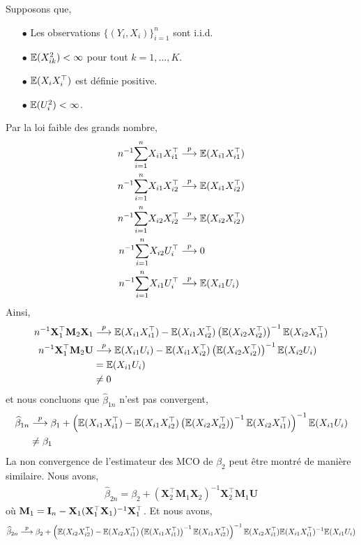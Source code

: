 \documentclass[12pt, reqno]{amsart}
\begin{document}
Supposons que,
\begin{itemize}
\item[$\bullet$] Les observations $\{(Y_i, X_i)\}_{i=1}^n$ sont i.i.d.
\item[$\bullet$] $\mathbb{E}(X_{ik}^2) < \infty$ pour tout $k=1,...,K$.
\item[$\bullet$] $\mathbb{E}(X_iX_i^\top)$ est définie positive.
\item[$\bullet$] $\mathbb{E}(U_i^2) < \infty$.
\end{itemize}
Par la loi faible des grands nombre,
\begin{align*}
n^{-1}\underset{i=1}{\overset{n}{\sum}} X_{i1}X_{i1}^\top &\overset{p}{\longrightarrow} \mathbb{E}(X_{i1}X_{i1}^\top)\\
n^{-1}\underset{i=1}{\overset{n}{\sum}} X_{i1}X_{i2}^\top &\overset{p}{\longrightarrow} \mathbb{E}(X_{i1}X_{i2}^\top)\\
n^{-1}\underset{i=1}{\overset{n}{\sum}} X_{i2}X_{i2}^\top &\overset{p}{\longrightarrow} \mathbb{E}(X_{i2}X_{i2}^\top)\\
n^{-1}\underset{i=1}{\overset{n}{\sum}} X_{i2}U_i^\top &\overset{p}{\longrightarrow} 0\\
n^{-1}\underset{i=1}{\overset{n}{\sum}} X_{i1}U_i^\top &\overset{p}{\longrightarrow} \mathbb{E}(X_{i1}U_i)
\end{align*}
Ainsi,
\begin{align*}
n^{-1}\mathbf{X}_1^\top\mathbf{M}_2\mathbf{X}_1 &\overset{p}{\longrightarrow} \mathbb{E}(X_{i1}X_{i1}^\top)-\mathbb{E}(X_{i1}X_{i2}^\top)\left( \mathbb{E}(X_{i2}X_{i2}^\top)\right)^{-1}\mathbb{E}(X_{i2}X_{i1}^\top)\\
n^{-1}\mathbf{X}_1^\top\mathbf{M}_2\mathbf{U} &\overset{p}{\longrightarrow} \mathbb{E}(X_{i1}U_i) - \mathbb{E}(X_{i1}X_{i2}^\top)\left( \mathbb{E}(X_{i2}X_{i2}^\top)\right)^{-1}\mathbb{E}(X_{i2}U_i)\\
&=\mathbb{E}(X_{i1}U_i) \\
&\neq 0
\end{align*}
et nous concluons que $\widehat{\beta}_{1n} $ n'est pas convergent,
\begin{align*}
\widehat{\beta}_{1n} &\overset{p}{\longrightarrow} \beta_1 + \left(\mathbb{E}(X_{i1}X_{i1}^\top)-\mathbb{E}(X_{i1}X_{i2}^\top)\left( \mathbb{E}(X_{i2}X_{i2}^\top)\right)^{-1}\mathbb{E}(X_{i2}X_{i1}^\top)\right)^{-1}\mathbb{E}(X_{i1}U_i)\\
&\neq \beta_1
\end{align*}
La non convergence de l'estimateur des MCO de $\beta_2$ peut être montré de manière similaire. Nous avons,
\begin{align*}
\widehat{\beta}_{2n} = \beta_2 + (\mathbf{X}_2^\top\mathbf{M}_1\mathbf{X}_2)^{-1}\mathbf{X}_2^\top\mathbf{M}_1\mathbf{U}
\end{align*}
où $\mathbf{M}_1 = \mathbf{I}_n - \mathbf{X}_1(\mathbf{X}_1^\top\mathbf{X}_1)^{-1}\mathbf{X}_1^\top$. Et nous avons,
\begin{align*}
\widehat{\beta}_{2n}  \overset{p}{\longrightarrow} \beta_2 + \left(\mathbb{E}(X_{i2}X_{i2}^\top)-\mathbb{E}(X_{i2}X_{i1}^\top)\left( \mathbb{E}(X_{i1}X_{i1}^\top)\right)^{-1}\mathbb{E}(X_{i1}X_{i2}^\top)\right)^{-1}\mathbb{E}(X_{i2}X_{i1}^\top)\mathbb{E}(X_{i1}X_{i1}^\top)^{-1}\mathbb{E}(X_{i1}U_i)
\end{align*}
\end{document}
